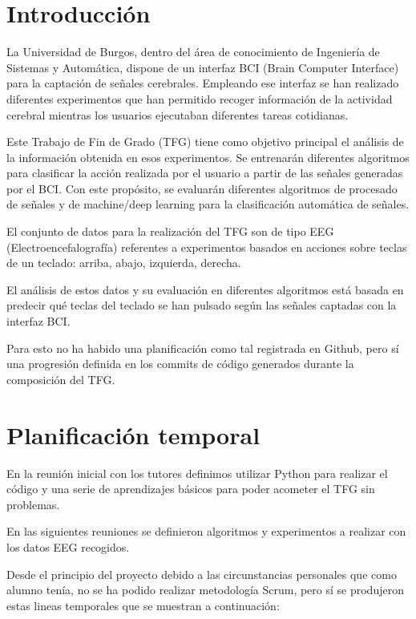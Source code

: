 
\section{Introducción}

La Universidad de Burgos, dentro del área de conocimiento de Ingeniería de Sistemas y Automática, dispone de un interfaz BCI (Brain Computer Interface) para la captación de señales cerebrales. 
Empleando ese interfaz se han realizado diferentes experimentos que han permitido recoger información de la actividad cerebral mientras los usuarios ejecutaban diferentes tareas cotidianas. 

Este Trabajo de Fin de Grado (TFG) tiene como objetivo principal el análisis de la información obtenida en esos experimentos. Se entrenarán diferentes algoritmos para clasificar la acción realizada por el usuario a partir de las señales generadas por el BCI. Con este propósito, se evaluarán diferentes algoritmos de procesado de señales y de machine/deep learning para la clasificación automática de señales.

El conjunto de datos para la realización del TFG son de tipo EEG (Electroencefalografía) referentes a experimentos basados en acciones sobre teclas de un teclado: arriba, abajo, izquierda, derecha.

El análisis de estos datos y su evaluación en diferentes algoritmos está basada en predecir qué teclas del teclado se han pulsado según las señales captadas con la interfaz BCI.

Para esto no ha habido una planificación como tal registrada en Github, pero sí una progresión definida en los commits de código generados durante la composición del TFG.

\section{Planificación temporal}


En la reunión inicial con los tutores definimos utilizar Python para realizar el código y una serie de aprendizajes básicos para poder acometer el TFG sin problemas.

En las siguientes reuniones se definieron algoritmos y experimentos a realizar con los datos EEG recogidos.

Desde el principio del proyecto debido a las circunstancias personales que como alumno tenía, no se ha podido realizar metodología Scrum, pero sí se produjeron estas lineas temporales que se muestran a continuación:

